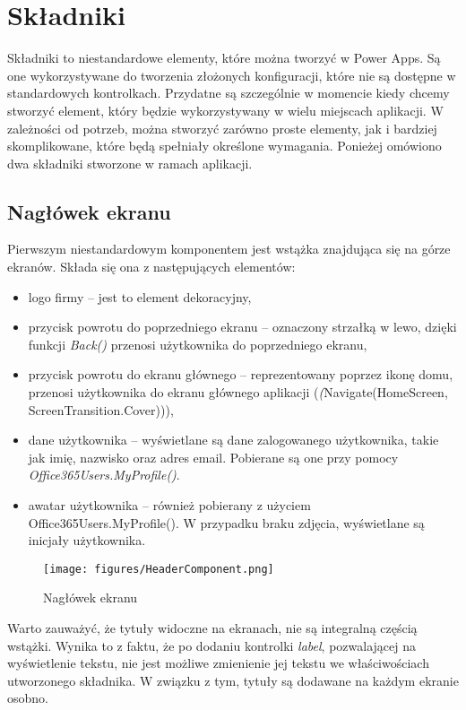 \section{Składniki}
Składniki to niestandardowe elementy, które można tworzyć w Power Apps. Są one wykorzystywane do tworzenia złożonych konfiguracji, które nie są dostępne w standardowych kontrolkach. Przydatne są szczególnie w momencie kiedy chcemy stworzyć element, który będzie wykorzystywany w wielu miejscach aplikacji. W zależności od potrzeb, można stworzyć zarówno proste elementy, jak i bardziej skomplikowane, które będą spełniały określone wymagania. Ponieżej omówiono dwa składniki stworzone w ramach aplikacji.

\subsection{Nagłówek ekranu}
Pierwszym niestandardowym komponentem jest wstążka znajdująca się na górze ekranów. Składa się ona z następujących elementów:
\begin{itemize}
\item logo firmy -- jest to element dekoracyjny,
\item przycisk powrotu do poprzedniego ekranu -- oznaczony strzałką w lewo, dzięki funkcji \textit{Back()} przenosi użytkownika do poprzedniego ekranu,
\item przycisk powrotu do ekranu głównego -- reprezentowany poprzez ikonę domu, przenosi użytkownika do ekranu głównego aplikacji (\emph(Navigate(HomeScreen, ScreenTransition.Cover))),
\item dane użytkownika -- wyświetlane są dane zalogowanego użytkownika, takie jak imię, nazwisko oraz adres email. Pobierane są one przy pomocy \emph{Office365Users.MyProfile()}. 
\item awatar użytkownika -- również pobierany z użyciem {Office365Users.MyProfile()}. W przypadku braku zdjęcia, wyświetlane są inicjały użytkownika.
\end{itemize}



\begin{figure}[H]
    \centering
    \texttt{[image: figures/HeaderComponent.png]}
    \caption{Nagłówek ekranu} 
    \label{fig:headercomponent}
\end{figure}

Warto zauważyć, że tytuły widoczne na ekranach, nie są integralną częścią wstążki. Wynika to z faktu, że po dodaniu kontrolki \emph{label}, pozwalającej na wyświetlenie tekstu, nie jest możliwe zmienienie jej  tekstu we właściwościach utworzonego składnika. W związku z tym, tytuły są dodawane na każdym ekranie osobno.

